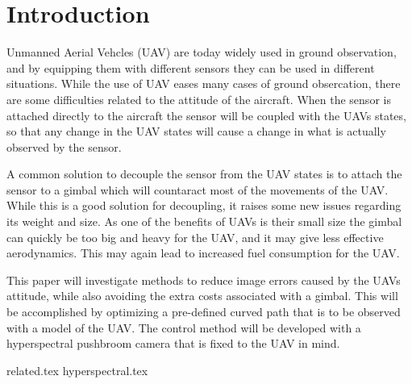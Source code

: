 \chapter{Introduction}

Unmanned Aerial Vehcles (UAV) are today widely used in ground observation, and by equipping them with different sensors they can be used in different situations. While the use of UAV eases many cases of ground obsercation, there are some difficulties related to the attitude of the aircraft. When the sensor is attached directly to the aircraft the sensor will be coupled with the UAVs states, so that any change in the UAV states will cause a change in what is actually observed by the sensor.

A common solution to decouple the sensor from the UAV states is to attach the sensor to a gimbal which will countaract most of the movements of the UAV. While this is a good solution for decoupling, it raises some new issues regarding its weight and size. As one of the benefits of UAVs is their small size the gimbal can quickly be too big and heavy for the UAV, and it may give less effective aerodynamics. This may again lead to increased fuel consumption for the UAV.

This paper will investigate methods to reduce image errors caused by the UAVs attitude, while also avoiding the extra costs associated with a gimbal. This will be accomplished by optimizing a pre-defined curved path that is to be observed with a model of the UAV. The control method will be developed with a hyperspectral pushbroom camera that is fixed to the UAV in mind.

{related.tex}
{hyperspectral.tex}
